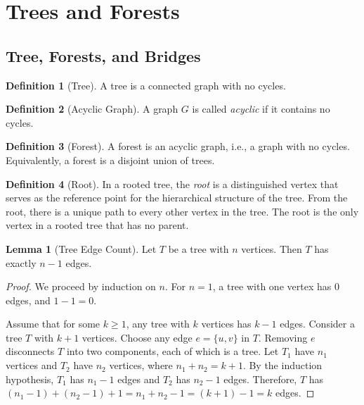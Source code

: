 \documentclass{article}
\theoremstyle{definition}
\newtheorem{lemma}{Lemma}
\newtheorem{definition}{Definition}
\begin{document}
\pagebreak
\section{Trees and Forests}

\subsection{Tree, Forests, and Bridges}

\begin{definition}[Tree]
A tree is a connected graph with no cycles.
\end{definition}

\begin{definition}[Acyclic Graph]
A graph $G$ is called \textit{acyclic} if it contains no cycles.
\end{definition}

\begin{definition}[Forest]
A forest is an acyclic graph, i.e., a graph with no cycles. Equivalently, a forest is a disjoint union of trees.
\end{definition}

\begin{definition}[Root]
In a rooted tree, the \textit{root} is a distinguished vertex that serves as the reference point for the hierarchical structure of the tree. From the root, there is a unique path to every other vertex in the tree. The root is the only vertex in a rooted tree that has no parent.
\end{definition}

\begin{lemma}[Tree Edge Count]
Let $T$ be a tree with $n$ vertices. Then $T$ has exactly $n-1$ edges.
\end{lemma}


\begin{proof}
We proceed by induction on $n$. For $n=1$, a tree with one vertex has 0 edges, and $1-1 = 0$.

Assume that for some $k \geq 1$, any tree with $k$ vertices has $k-1$ edges. Consider a tree $T$ with $k+1$ vertices. Choose any edge $e = \{u, v\}$ in $T$. Removing $e$ disconnects $T$ into two components, each of which is a tree. Let $T_1$ have $n_1$ vertices and $T_2$ have $n_2$ vertices, where $n_1 + n_2 = k+1$. By the induction hypothesis, $T_1$ has $n_1 - 1$ edges and $T_2$ has $n_2 - 1$ edges. Therefore, $T$ has $(n_1 - 1) + (n_2 - 1) + 1 = n_1 + n_2 - 1 = (k+1) - 1 = k$ edges.
\end{proof}
\end{document}
